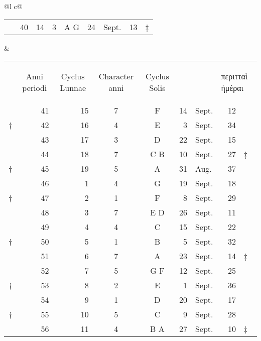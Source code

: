 \begin{tabular}{@{}l c@{}}
\begin{tabular}[t]{@{}r rrcc r@{~}l r l@{}}
~ & 40 & 14 &  3 & A G & 24 & Sept. & 13 & ‡ \\
\cmidrule{2-8}
\end{tabular}
&
\begin{tabular}[t]{@{}r rrcc r@{~}l r l@{}}
~ &
\multicolumn{1}{c}{\begin{rotate}{60}Anni periodi\end{rotate}} &
\multicolumn{1}{c}{\begin{rotate}{60}Cyclus Lunnae\end{rotate}} &
\multicolumn{1}{c}{\begin{rotate}{60}Character anni\end{rotate}} &
\multicolumn{1}{c}{\begin{rotate}{60}Cyclus Solis\end{rotate}} &
& &
\multicolumn{2}{l}{\begin{turn}{60}\textgreek{περιτταὶ ἡμέραι}\end{turn}}
\\
\cmidrule{2-8}
~ & 41 & 15 &  7 &  F  & 14 &Sept. & 12 \\
† & 42 & 16 &  4 &  E  &  3 &Sept. & 34 \\
~ & 43 & 17 &  3 &  D  & 22 &Sept. & 15 & ~ \\
~ & 44 & 18 &  7 & C B & 10 &Sept. & 27 & ‡ \\
\cmidrule{2-8}
† & 45 & 19 &  5 &  A  & 31 &Aug.  & 37 \\
~ & 46 &  1 &  4 &  G  & 19 &Sept. & 18 \\
† & 47 &  2 &  1 &  F  &  8 &Sept. & 29 \\
~ & 48 &  3 &  7 & E D & 26 &Sept. & 11 \\
\cmidrule{2-8}
~ & 49 &  4 &  4 &  C  & 15 &Sept. & 22 \\
† & 50 &  5 &  1 &  B  &  5 &Sept. & 32 \\
~ & 51 &  6 &  7 &  A  & 23 &Sept. & 14 & ‡ \\
~ & 52 &  7 &  5 & G F & 12 &Sept. & 25 \\
\cmidrule{2-8}
† & 53 &  8 &  2 &  E  &  1 &Sept. & 36 \\
~ & 54 &  9 &  1 &  D  & 20 &Sept. & 17 \\
† & 55 & 10 &  5 &  C  &  9 &Sept. & 28 \\
~ & 56 & 11 &  4 & B A & 27 &Sept. & 10 & ‡ \\
\cmidrule{2-8}

\end{tabular}
\end{tabular}
